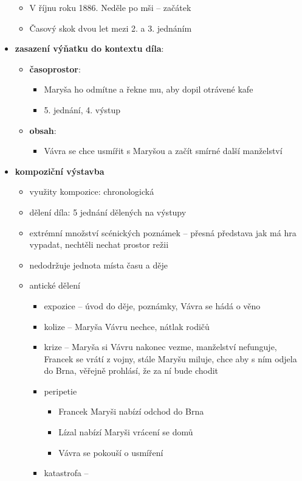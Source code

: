 \documentclass[10pt,a4paper]{article}
\begin{document}
\begin{itemize}
\begin{itemize}
\begin{itemize}
		\end{itemize}
	\item V říjnu roku 1886. Neděle po mši -- začátek
	\item Časový skok dvou let mezi 2. a 3. jednáním
	\end{itemize}
\item \textbf{zasazení výňatku do kontextu díla}:
	\begin{itemize}
	\item \textbf{časoprostor}:
		\begin{itemize}
		\item Maryša ho odmítne a řekne mu, aby dopil otrávené kafe
		\item 5. jednání, 4. výstup
		\end{itemize}
	\item \textbf{obsah}: 
		\begin{itemize}
		\item Vávra se chce usmířit s Maryšou a začít smírné další manželství
		\end{itemize}
	\end{itemize}
\item \textbf{kompoziční výstavba}
	\begin{itemize}
	\item využity kompozice: chronologická
	\item dělení díla: 5 jednání dělených na výstupy
	\item extrémní množství scénických poznámek -- přesná představa jak má hra vypadat, nechtěli nechat prostor režii
	\item nedodržuje jednota místa času a děje
	\item antické dělení
		\begin{itemize}
		\item expozice -- úvod do děje, poznámky, Vávra se hádá o věno
		\item kolize -- Maryša Vávru nechce, nátlak rodičů
		\item krize -- Maryša si Vávru nakonec vezme, manželství nefunguje, Francek se vrátí z vojny, stále Maryšu miluje, chce aby s ním odjela do Brna, věřejně prohlásí, že za ní bude chodit
		\item peripetie
			\begin{itemize}
			\item Francek Maryši nabízí odchod do Brna
			\item Lízal nabízí Maryši vrácení se domů
			\item Vávra se pokouší o usmíření
			\end{itemize}
		\item katastrofa -- 
		\end{itemize}
	\end{itemize}
\end{itemize}
\end{document}
